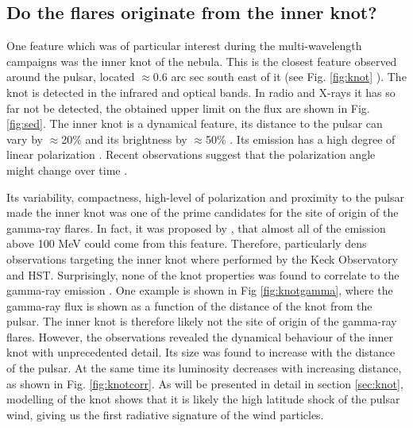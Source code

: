 \subsection{Do the flares originate from the inner knot?}  One feature which was of particular interest during the multi-wavelength campaigns was the inner knot of the nebula. This is the closest feature observed around the pulsar, located $\approx$0.6 arc sec south east of it (see Fig. \ref{fig:knot} ). The knot is detected in the infrared and optical bands. In radio and X-rays it has so far not be detected, the obtained upper limit on the flux are shown in Fig. \ref{fig:sed}. The inner knot is a dynamical feature, its distance to the pulsar can vary by $\approx$20\%  and its brightness by $\approx$50\% \cite{Sandberg2009}.  Its emission has a high degree of linear polarization \cite{Moran_2013}. Recent observations suggest that the polarization angle might change over time \cite{Moran_2015} . 

Its variability, compactness, high-level of polarization and proximity to the pulsar made the inner knot was one of the prime candidates for the site of origin of the gamma-ray flares.  In fact, it was proposed by \citet{komissarov2011}, that almost all of the emission above 100 MeV could come from this feature. Therefore, particularly dens observations targeting the inner knot where performed by the Keck Observatory and HST. Surprisingly, none of the knot properties was found to correlate to the gamma-ray emission \cite{rudy2015}. One example is shown in Fig \ref{fig:knotgamma},  where the gamma-ray flux is shown as a function of the distance of the knot from the pulsar. The inner knot is therefore likely not the site of origin of the gamma-ray flares. However, the observations revealed the dynamical behaviour of the inner knot with unprecedented detail. Its size was found to increase with the distance of the pulsar. At the same time its luminosity decreases with increasing distance, as shown in Fig. \ref{fig:knotcorr}.  As will be presented in detail in section \ref{sec:knot}, modelling of the knot shows that it is likely the high latitude shock of the pulsar wind, giving us the first radiative signature of the wind particles.